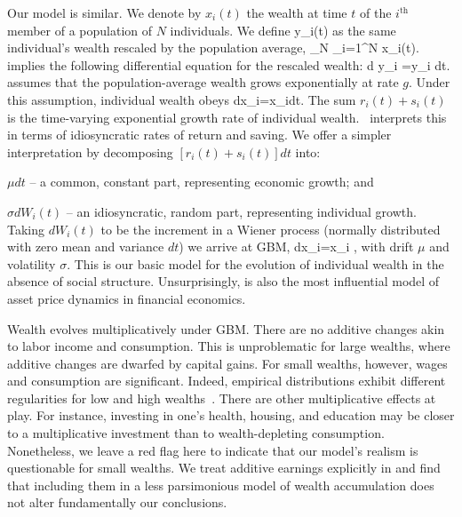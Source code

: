 Our model is similar. We denote by $x_i\left(t\right)$ the wealth at time $t$ of the $i^\text{th}$ member of a population of $N$ individuals. We define
\be
y_i\left(t\right) \equiv {}
\ee
as the same individual's wealth rescaled by the population average,
\be
{}_N \equiv {}\sum_{i=1}^N x_i\left(t\right).
\ee
{} implies the following differential equation for the rescaled wealth:
\be
d y_i =y_i dt.
\ee
\cite{meade1964efficiency} assumes that the population-average wealth grows exponentially at rate $g$. Under this assumption, individual wealth obeys
\be
dx_i=x_idt.
\ee
The sum $r_i\left(t\right) + s_i\left(t\right)$ is the time-varying exponential growth rate of individual wealth.~\cite{meade1964efficiency} interprets this in terms of idiosyncratic rates of return and saving. We offer a simpler interpretation by decomposing $\left[r_i\left(t\right) + s_i\left(t\right)\right]dt$ into:
\bi
\item $\mu dt$ -- a common, constant part, representing economic growth; and
\item $\sigma dW_i\left(t\right)$ -- an idiosyncratic, random part, representing individual growth. 
\ei
Taking $dW_i\left(t\right)$ to be the increment in a Wiener process (normally distributed with zero mean and variance $dt$) we arrive at GBM,
\be
dx_i=x_i ,
\ee
with drift $\mu$ and volatility $\sigma$. This is our basic model for the evolution of individual wealth in the absence of social structure. Unsurprisingly,  is also the most influential model of asset price dynamics in financial economics. 


Wealth evolves multiplicatively under GBM. There are no additive changes akin to labor income and consumption. This is unproblematic for large wealths, where additive changes are dwarfed by capital gains. For small wealths, however, wages and consumption are significant. Indeed, empirical distributions exhibit different regularities for low and high wealths~\cite{DragulescuYakovenko2001}. There are other multiplicative effects at play. For instance, investing in one's health, housing, and education may be closer to a multiplicative investment than to wealth-depleting consumption. Nonetheless, we leave a red flag here to indicate that our model's realism is questionable for small wealths. We treat additive earnings explicitly in  and find that including them in a less parsimonious model of wealth accumulation does not alter fundamentally our conclusions.

